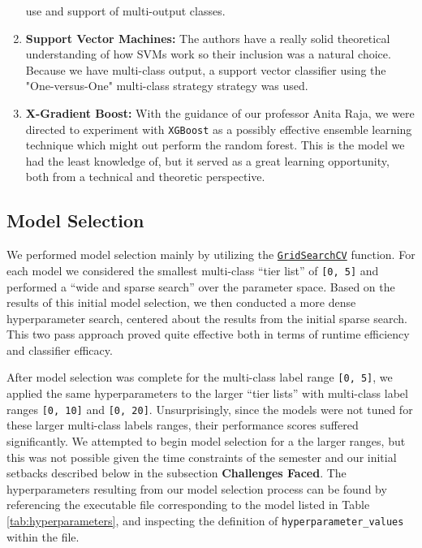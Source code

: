 \documentclass[12pt]{diazessay}
\begin{document}
\begin{enumerate}
  use and support of multi-output classes.
\item
  \textbf{Support Vector Machines:} The authors have a really solid
  theoretical understanding of how SVMs work so their inclusion was a
  natural choice. Because we have multi-class output, a support vector
  classifier using the "One-versus-One" multi-class strategy strategy was
  used.
\item
  \textbf{X-Gradient Boost:} With the guidance of our professor Anita
  Raja, we were directed to experiment with \texttt{XGBoost} as a
  possibly effective ensemble learning technique which might out perform
  the random forest. This is the model we had the least knowledge of,
  but it served as a great learning opportunity, both from a technical
  and theoretic perspective.
\end{enumerate}

\hypertarget{model-selection}{%
\subsection{Model Selection}\label{model-selection}}

We performed model selection mainly by utilizing the \href{https://scikit-learn.org/stable/modules/generated/sklearn.model_selection.GridSearchCV.html}{\texttt{GridSearchCV}} function.
For each model we considered the smallest multi-class ``tier list'' of \texttt{[0, 5]} and performed a ``wide and sparse search'' over the parameter space.
Based on the results of this initial model selection, we then conducted a more dense hyperparameter search, centered about the results from the initial sparse search.
This two pass approach proved quite effective both in terms of runtime efficiency and classifier efficacy.

After model selection was complete for the multi-class label range \texttt{[0, 5]}, we applied the same hyperparameters to the larger ``tier lists'' with multi-class label ranges \texttt{[0, 10]} and \texttt{[0, 20]}.
Unsurprisingly, since the models were not tuned for these larger multi-class labels ranges, their performance scores suffered significantly.
We attempted to begin model selection for a the larger ranges, but this was not possible given the time constraints of the semester and our initial setbacks described below in the subsection \textbf{Challenges Faced}.
The hyperparameters resulting from our model selection process can be found by referencing the executable file corresponding to the model listed in Table \ref{tab:hyperparameters}, and inspecting the definition of \texttt{hyperparameter\_values} within the file.
\end{document}

